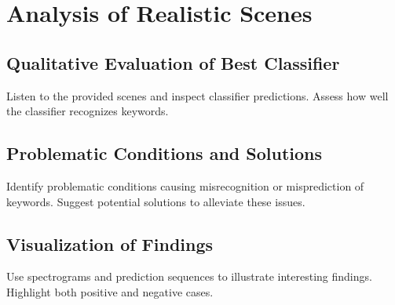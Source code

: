 \section{Analysis of Realistic Scenes}

\subsection{Qualitative Evaluation of Best Classifier}
Listen to the provided scenes and inspect classifier predictions. Assess how well the classifier recognizes keywords.

\subsection{Problematic Conditions and Solutions}
Identify problematic conditions causing misrecognition or misprediction of keywords. Suggest potential solutions to alleviate these issues.

\subsection{Visualization of Findings}
Use spectrograms and prediction sequences to illustrate interesting findings. Highlight both positive and negative cases.
